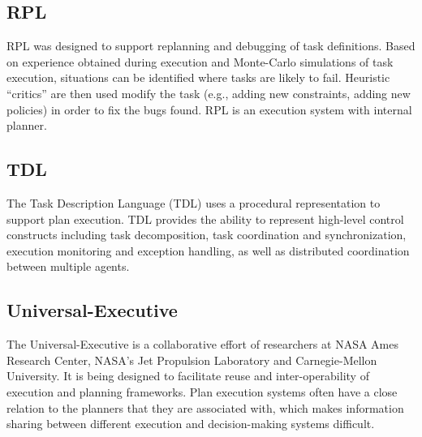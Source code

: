 \documentclass[conference]{IEEEtran}
\begin{document}
\subsection{\textbf{RPL}}\label{sec:rpl}
RPL was designed to support replanning and debugging of task definitions. Based on experience obtained during execution and Monte-Carlo simulations of task execution, situations can be identified where tasks are likely to fail. Heuristic “critics” are then used modify the task (e.g., adding new constraints, adding new policies) in order to fix the bugs found. RPL is an execution system with internal planner.

\subsection{\textbf{TDL}}\label{sec:tdl}
The Task Description Language (TDL) uses a procedural representation to support plan execution.
TDL provides the ability to represent high-level control constructs including task decomposition, task coordination and synchronization, execution monitoring and exception handling, as well as distributed coordination between multiple agents.

\subsection{\textbf{Universal-Executive}}\label{sec:universal}
The Universal-Executive is a collaborative effort of researchers at NASA Ames Research Center, NASA’s Jet Propulsion Laboratory and Carnegie-Mellon University. It is being designed to facilitate reuse and inter-operability of execution and planning frameworks. Plan execution systems often have a close relation to the planners that they are associated with, which makes information sharing between different execution and decision-making systems difficult.
\end{document}
